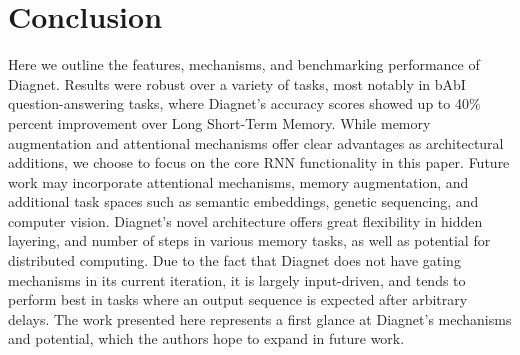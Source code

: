 \documentclass{article}
\begin{document}
\section{Conclusion}
Here we outline the features, mechanisms, and benchmarking performance of Diagnet. Results were robust over a variety of tasks, most notably in bAbI question-answering tasks, where Diagnet’s accuracy scores showed up to 40\% percent improvement over Long Short-Term Memory.  While memory augmentation and attentional mechanisms offer clear advantages as architectural additions, we choose to focus on the core RNN functionality in this paper.  Future work may incorporate attentional mechanisms, memory augmentation, and additional task spaces such as semantic embeddings, genetic sequencing, and computer vision.  Diagnet’s novel architecture offers great flexibility in hidden layering, and number of steps in various memory tasks, as well as potential for distributed computing.  Due to the fact that Diagnet does not have gating mechanisms in its current iteration, it is largely input-driven, and tends to perform best in tasks where an output sequence is expected after arbitrary delays. The work presented here represents a first glance at Diagnet’s mechanisms and potential, which the authors hope to expand in future work. 
\end{document}
